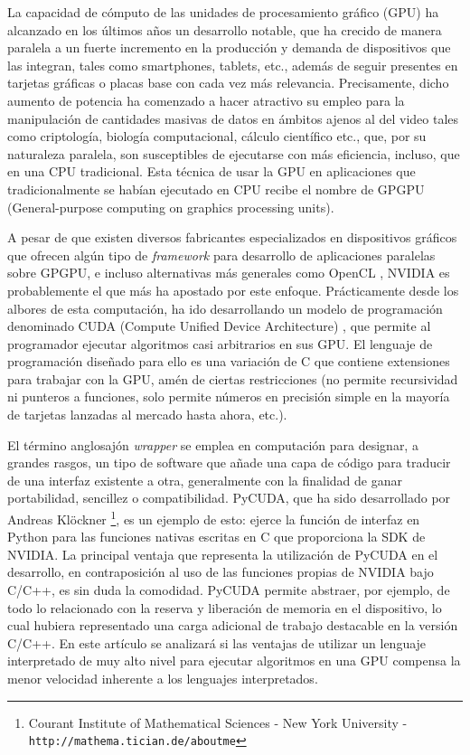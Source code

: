 \documentclass[twocolumn,twoside]{Jornadas}
\begin{document}
La capacidad de cómputo de las unidades de procesamiento gráfico (GPU) ha alcanzado en los últimos años un desarrollo notable, que ha crecido de manera paralela a un fuerte incremento en la producción y demanda de dispositivos que las integran, tales como smartphones, tablets, etc., además de seguir presentes en tarjetas gráficas o placas base con cada vez más relevancia. Precisamente, dicho aumento de potencia ha comenzado a hacer atractivo su empleo para la manipulación de cantidades masivas de datos en ámbitos ajenos al del video tales como criptología, biología computacional, cálculo científico etc., que, por su naturaleza paralela, son susceptibles de ejecutarse con más eficiencia, incluso, que en una CPU tradicional. Esta técnica de usar la GPU en aplicaciones que tradicionalmente se habían ejecutado en CPU recibe el nombre de GPGPU (General-purpose computing on graphics processing units).


A pesar de que existen diversos fabricantes especializados en dispositivos gráficos que ofrecen algún tipo de \emph{framework} para desarrollo de aplicaciones paralelas sobre GPGPU, e incluso alternativas más generales como OpenCL \cite{opencl}, NVIDIA es probablemente el que más ha apostado por este enfoque. Prácticamente desde los albores de esta computación, ha ido desarrollando un modelo de programación denominado CUDA (Compute Unified Device Architecture) \cite{aboutcuda}, que permite al programador ejecutar algoritmos casi arbitrarios en sus GPU. El lenguaje de programación diseñado para ello es una variación de C que contiene extensiones para trabajar con la GPU, amén de ciertas restricciones (no permite recursividad ni punteros a funciones, solo permite números en precisión simple en la mayoría de tarjetas lanzadas al mercado hasta ahora, etc.).


El término anglosajón \emph{wrapper} se emplea en computación para designar, a grandes rasgos, un tipo de software que añade una capa de código para traducir de una interfaz existente a otra, generalmente con la finalidad de ganar portabilidad, sencillez o compatibilidad. PyCUDA, que ha sido desarrollado por Andreas Klöckner \footnote[2]{Courant Institute of Mathematical Sciences - New York University - {\tt http://mathema.tician.de/aboutme}}, es un ejemplo de esto: ejerce la función de interfaz en Python para las funciones nativas escritas en C que proporciona la SDK de NVIDIA. La principal ventaja que representa la utilización de PyCUDA en el desarrollo, en contraposición al uso de las funciones propias de NVIDIA bajo C/C++, es sin duda la comodidad. PyCUDA permite abstraer, por ejemplo, de todo lo relacionado con la reserva y liberación de memoria en el dispositivo, lo cual hubiera representado una carga adicional de trabajo destacable en la versión C/C++. En este artículo se analizará si las ventajas de utilizar un lenguaje interpretado de muy alto nivel para ejecutar algoritmos en una GPU compensa la menor velocidad inherente a los lenguajes interpretados.
\end{document}
